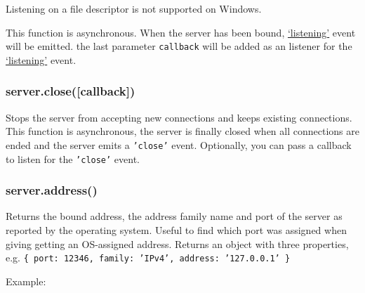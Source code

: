 Listening on a file descriptor is not supported on Windows.

This function is asynchronous. When the server has been bound,
\hyperref[netux5feventux5flistening]{`listening'} event will be emitted.
the last parameter \texttt{callback} will be added as an listener for
the \hyperref[netux5feventux5flistening]{`listening'} event.

\subsubsection{server.close({[}callback{]})}\label{server.closecallback}

Stops the server from accepting new connections and keeps existing
connections. This function is asynchronous, the server is finally closed
when all connections are ended and the server emits a \texttt{'close'}
event. Optionally, you can pass a callback to listen for the
\texttt{'close'} event.

\subsubsection{server.address()}\label{server.address}

Returns the bound address, the address family name and port of the
server as reported by the operating system. Useful to find which port
was assigned when giving getting an OS-assigned address. Returns an
object with three properties, e.g.
\texttt{\{ port: 12346, family: 'IPv4', address: '127.0.0.1' \}}

Example:

\begin{Shaded}
\end{Shaded}

